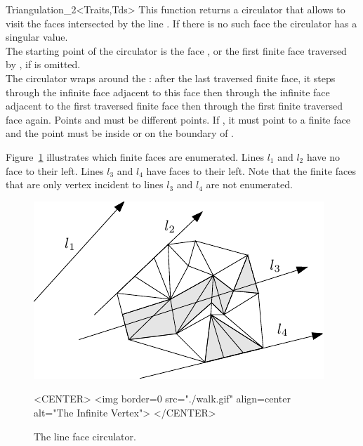 \begin{ccRefClass}{Triangulation_2<Traits,Tds>}
{ This function returns a circulator that allows to visit the 
 faces intersected by the line . 
If there is no such face the circulator has a singular value.\\
 The starting point of the circulator is the face , or
 the first finite face traversed by  , if
  is omitted. \\
  The circulator wraps around the  :
after the last traversed finite face, it steps through the infinite face adjacent
to this face then through the infinite face adjacent to the first
traversed finite face then through the first finite traversed face
again.
\ccPrecond Points  and  must be different points.
\ccPrecond If , it must point to a finite face
 and the point  must be
inside or on the boundary of .}

Figure~\ref{Triangulation_ref_Fig_Line_face_circulator} illustrates which finite faces are enumerated. Lines
$l_1$ and $l_2$ have no face to their left. Lines $l_3$ and $l_4$
have faces to their left. Note that the finite faces that are only vertex
incident to lines $l_3$ and  $l_4$ are not enumerated.

\begin{figure}
\begin{ccTexOnly}
\begin{center}  \includegraphics{Triangulation_2/walk} \end{center}
\end{ccTexOnly} 
\caption{The line face circulator.
\label{Triangulation_ref_Fig_Line_face_circulator}}

\begin{ccHtmlOnly}
<CENTER>
<img border=0 src="./walk.gif" align=center alt="The Infinite Vertex">
</CENTER>
\end{ccHtmlOnly} 
\end{figure}


\end{ccRefClass}
